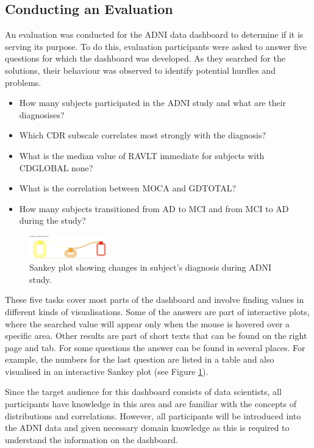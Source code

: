 \documentclass[11pt]{article}
\begin{document}
\subsection{Conducting an Evaluation}

An evaluation was conducted for the ADNI data dashboard to determine if it is serving its purpose. To do this, evaluation participants were asked to answer five questions for which the dashboard was developed. As they searched for the solutions, their behaviour was observed to identify potential hurdles and problems.

\begin{itemize}
    \item How many subjects participated in the ADNI study and what are their diagnosises?
    \item Which CDR subscale correlates most strongly with the diagnosis?
    \item What is the median value of RAVLT immediate for subjects with CDGLOBAL none?
    \item What is the correlation between MOCA and GDTOTAL?
    \item How many subjects transitioned from AD to MCI and from MCI to AD during the study?
\end{itemize}

\begin{figure}
    \includegraphics[width=0.3\textwidth]{./sankey.png}
    \caption{Sankey plot showing changes in subject's diagnosis during ADNI study.}
    \label{sankey}
\end{figure}

These five tasks cover most parts of the dashboard and involve finding values in different kinds of visualisations. Some of the answers are part of interactive plots, where the searched value will appear only when the mouse is hovered over a specific area. Other results are part of short texts that can be found on the right page and tab. For some questions the answer can be found in several places. For example, the numbers for the last question are listed in a table and also visualised in an interactive Sankey plot (see Figure \ref{sankey}).

Since the target audience for this dashboard consists of data scientists, all participants have knowledge in this area and are familiar with the concepts of distributions and correlations. However, all participants will be introduced into the ADNI data and given necessary domain knowledge as this is required to understand the information on the dashboard.
\end{document}
